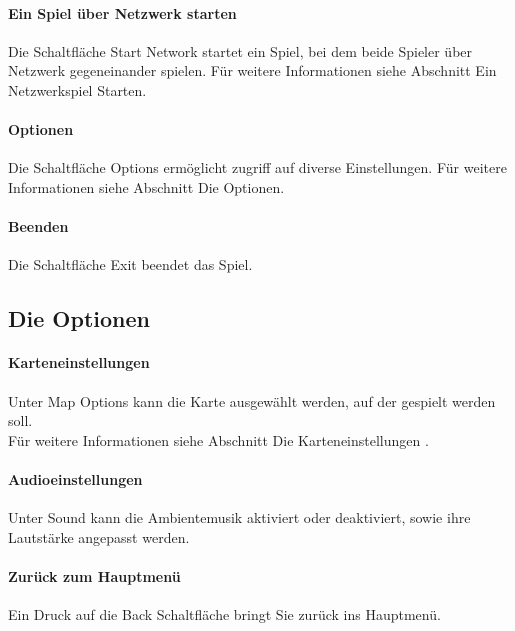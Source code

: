 \documentclass[a4paper,12pt]{scrartcl}
\begin{document}
	\paragraph{Ein Spiel über Netzwerk starten}
	Die Schaltfläche \glqq Start Network\grqq\hspace{0.05em} startet ein Spiel, bei dem beide Spieler über Netzwerk gegeneinander spielen.
	Für weitere Informationen siehe Abschnitt \glqq Ein Netzwerkspiel Starten\grqq\hspace{0.05em}.
	
	\paragraph{Optionen}
	Die Schaltfläche \glqq Options\grqq\hspace{0.05em} ermöglicht zugriff auf diverse Einstellungen.
	Für weitere Informationen siehe Abschnitt \glqq Die Optionen\grqq\hspace{0.05em}.
	
	\paragraph{Beenden}
	Die Schaltfläche \glqq Exit\grqq\hspace{0.05em} beendet das Spiel.
	
	\subsection{Die Optionen}
	
	\paragraph{Karteneinstellungen}
	Unter \glqq Map Options\grqq\hspace{0.05em}  kann die Karte ausgewählt werden, auf der gespielt werden soll.\\
	Für weitere Informationen siehe Abschnitt \glqq Die Karteneinstellungen\grqq\hspace{0.05em} .
	
	\paragraph{Audioeinstellungen}
	Unter \glqq Sound\grqq\hspace{0.05em}  kann die Ambientemusik aktiviert oder deaktiviert, sowie ihre Lautstärke angepasst werden.
	
	\paragraph{Zurück zum Hauptmenü}
	Ein Druck auf die \glqq Back\grqq\hspace{0.05em}  Schaltfläche bringt Sie zurück ins Hauptmenü.
	
\end{document}
